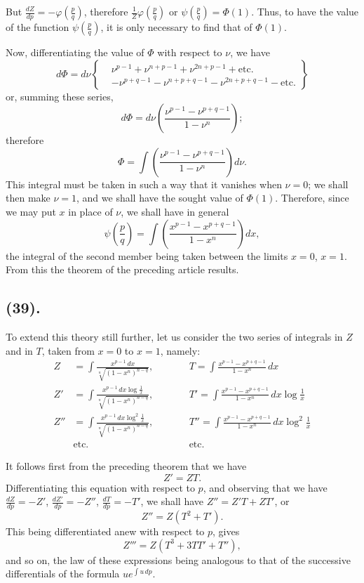 \documentclass{article}
\begin{document}
But $\frac{dZ}{dp}=-\varphi\left(\frac{p}{q}\right)$, therefore $\frac{1}{Z}\varphi\left(\frac{p}{q}\right)$ or $\psi\left(\frac{p}{q}\right)=\Phi(1)$. Thus, to have the value of the function $\psi\left(\frac{p}{q}\right)$, it is only necessary to find that of $\Phi(1)$.

Now, differentiating the value of $\Phi$ with respect to $\nu$, we have
\[ d\Phi=d\nu\left\{\begin{aligned} &\nu^{p-1}+\nu^{n+p-1}+\nu^{2n+p-1}+\text{etc.}\\ &-\nu^{p+q-1}-\nu^{n+p+q-1}-\nu^{2n+p+q-1}-\text{etc.} \end{aligned}\right\} \]
or, summing these series,
\[ d\Phi=d\nu\left(\frac{\nu^{p-1}-\nu^{p+q-1}}{1-\nu^{n}}\right); \]
therefore
\[ \Phi=\int\left(\frac{\nu^{p-1}-\nu^{p+q-1}}{1-\nu^{n}}\right)d\nu. \]
This integral must be taken in such a way that it vanishes when $\nu=0$; we shall then make $\nu=1$, and we shall have the sought value of $\Phi(1)$. Therefore, since we may put $x$ in place of $\nu$, we shall have in general
\[ \psi\left(\frac{p}{q}\right)=\int\left(\frac{x^{p-1}-x^{p+q-1}}{1-x^{n}}\right)dx, \]
the integral of the second member being taken between the limits $x=0$, $x=1$. From this the theorem of the preceding article results.

\subsection*{(39).}

To extend this theory still further, let us consider the two series of integrals in $Z$ and in $T$, taken from $x=0$ to $x=1$, namely:
\[ \begin{aligned} Z&=\int\frac{x^{p-1}\,dx}{\sqrt[n]{(1-x^{n})^{n-q}}}, &\qquad& T=\int\frac{x^{p-1}-x^{p+q-1}}{1-x^{n}}\,dx\\ Z'&=\int\frac{x^{p-1}\,dx\log\frac{1}{x}}{\sqrt[n]{(1-x^{n})^{n-q}}}, && T'=\int\frac{x^{p-1}-x^{p+q-1}}{1-x^{n}}\,dx\log\frac{1}{x}\\ Z''&=\int\frac{x^{p-1}\,dx\log^{2}\frac{1}{x}}{\sqrt[n]{(1-x^{n})^{n-q}}}, && T''=\int\frac{x^{p-1}-x^{p+q-1}}{1-x^{n}}\,dx\log^{2}\frac{1}{x}\\ &\text{etc.} && \text{etc.} \end{aligned} \]

It follows first from the preceding theorem that we have
\[ Z'=ZT. \]
Differentiating this equation with respect to $p$, and observing that we have $\frac{dZ}{dp}=-Z'$, $\frac{dZ'}{dp}=-Z''$, $\frac{dT}{dp}=-T'$, we shall have $Z''=Z'T+ZT'$, or
\[ Z''=Z(T^{2}+T'). \]
This being differentiated anew with respect to $p$, gives
\[ Z'''=Z(T^{3}+3TT'+T''), \]
and so on, the law of these expressions being analogous to that of the successive differentials of the formula $ue^{\displaystyle\int u\,dp}$.
\end{document}
